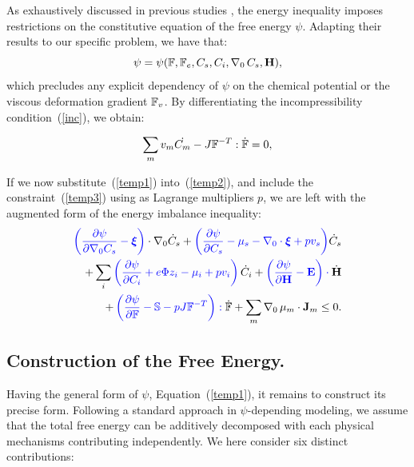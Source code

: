 As exhaustively discussed in previous studies \cite{Plasto,GURTIN}, the energy inequality imposes restrictions on the constitutive equation of the free energy $\psi$. Adapting their results to our specific problem, we have that:
\begin{equation}
\psi = \psi (\mathbb{F},\mathbb{F}_e, C_s, C_i, \nabla_0 \,C_s,\mathbf{H}), \label{temp1}
\end{equation}
which precludes any explicit dependency of $\psi$ on the chemical potential or the viscous deformation gradient $\mathbb{F}_v$. By differentiating the incompressibility condition~(\ref{inc}), we obtain:

\begin{gather}
\sum_m v_m\dot{C_m} - J \mathbb{F}^{-T}:\dot{\mathbb{F}} =0, \label{temp3}
\end{gather}

If we now substitute~(\ref{temp1}) into~(\ref{temp2}), and include the constraint~(\ref{temp3}) using as Lagrange multipliers $p$, we are left with the augmented form of the energy imbalance inequality:
\begin{equation}
\begin{aligned}
\color{blue}{\left(\frac{\partial \psi}{\partial \nabla_0 C_s}-\boldsymbol{\xi}\right)} \color{black}\cdot \nabla_0 \dot{C}_s + \color{blue}{\left(\frac{\partial \psi}{\partial C_s}-\mu_s-\nabla_0 \cdot \boldsymbol{\xi}+p v_s\right)}\color{black}\dot{C}_s\\
+ \sum_i\color{blue}\left(\frac{\partial \psi}{\partial C_i} + e\Phi z_i-\mu_i+pv_i\right) \color{black}\dot{C}_i +\color{blue}\left(\frac{\partial \psi}{\partial \mathbf{H}}-\mathbf{E}\right) \cdot \color{black}\dot{\mathbf{H}}\\
+ \color{blue} \left(\frac{\partial \psi}{\partial \mathbb{F}} - \mathbb{S} - p J \mathbb{F}^{-T}\right): \color{black}\dot{\mathbb{F}}+ \sum_m \nabla_0 \,\mu_m \cdot \mathbf{J}_m \leq 0 . \label{ineq}
\end{aligned}
\end{equation}

\subsection{Construction of the Free Energy.}

Having the general form of $\psi$, Equation~(\ref{temp1}), it remains to construct its precise form. Following a standard approach in $\psi$-depending modeling, we assume that the total free energy can be additively decomposed with each physical mechanisms contributing independently. We here consider six distinct contributions:

